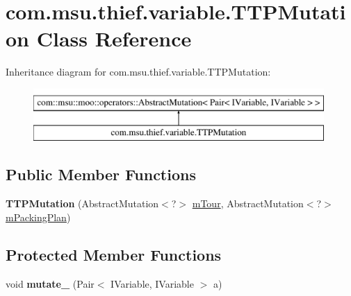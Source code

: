\hypertarget{classcom_1_1msu_1_1thief_1_1variable_1_1TTPMutation}{\section{com.\-msu.\-thief.\-variable.\-T\-T\-P\-Mutation Class Reference}
\label{classcom_1_1msu_1_1thief_1_1variable_1_1TTPMutation}
}
Inheritance diagram for com.\-msu.\-thief.\-variable.\-T\-T\-P\-Mutation\-:\begin{figure}[H]
\begin{center}
\leavevmode
\includegraphics[height=2.000000cm]{classcom_1_1msu_1_1thief_1_1variable_1_1TTPMutation}
\end{center}
\end{figure}
\subsection*{Public Member Functions}
\begin{DoxyCompactItemize}
\item 
\hypertarget{classcom_1_1msu_1_1thief_1_1variable_1_1TTPMutation_a65b0b0ee53ca57500f2f270b0478f6d5}{{\bfseries T\-T\-P\-Mutation} (Abstract\-Mutation$<$?$>$ \hyperlink{classcom_1_1msu_1_1thief_1_1variable_1_1TTPMutation_ace8bf1825ff37a4e0a4bdfa1ac581924}{m\-Tour}, Abstract\-Mutation$<$?$>$ \hyperlink{classcom_1_1msu_1_1thief_1_1variable_1_1TTPMutation_ad49e8ad884aad46fdc8724fd1e168f64}{m\-Packing\-Plan})}\label{classcom_1_1msu_1_1thief_1_1variable_1_1TTPMutation_a65b0b0ee53ca57500f2f270b0478f6d5}

\end{DoxyCompactItemize}
\subsection*{Protected Member Functions}
\begin{DoxyCompactItemize}
\item 
\hypertarget{classcom_1_1msu_1_1thief_1_1variable_1_1TTPMutation_a1f50962a59474c475247d80a2940112b}{void {\bfseries mutate\-\_\-} (Pair$<$ I\-Variable, I\-Variable $>$ a)}\label{classcom_1_1msu_1_1thief_1_1variable_1_1TTPMutation_a1f50962a59474c475247d80a2940112b}

\end{DoxyCompactItemize}
